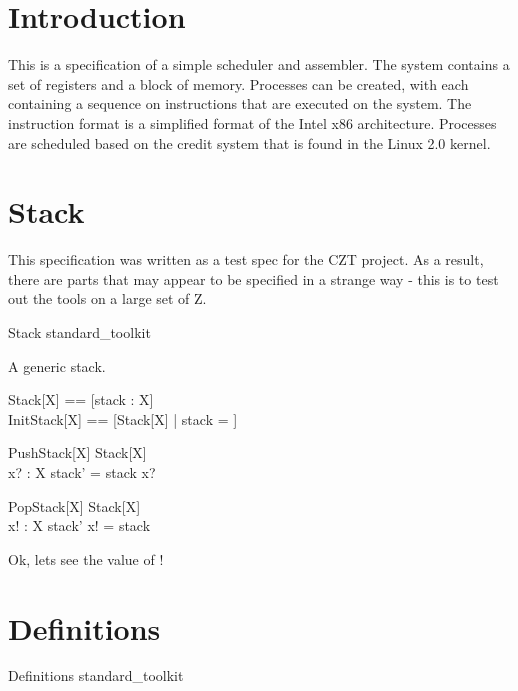 \documentclass{article}
\begin{document}
\section{Introduction}

This is a specification of a simple scheduler and assembler. The
system contains a set of registers and a block of memory. Processes
can be created, with each containing a sequence on instructions that
are executed on the system. The instruction format is a simplified
format of the Intel x86 architecture. Processes are scheduled based on
the credit system that is found in the Linux 2.0 kernel.

\section{Stack}

This specification was written as a test spec for the CZT project. As
a result, there are parts that may appear to be specified in a strange
way - this is to test out the tools on a large set of Z.

\begin{zsection}
  \SECTION Stack \parents standard\_toolkit
\end{zsection}

A generic stack.

\begin{zed}
  Stack[X] == [stack : \seq X]\\
  InitStack[X] == [Stack[X] | stack = \emptyset]
\end{zed}

\begin{schema}{PushStack}[X]
  \Delta Stack[X]\\
  x? : X
\where
  stack' = stack \cat \langle x? \rangle
\end{schema}

\begin{schema}{PopStack}[X]
  \Delta Stack[X]\\
  x! : X
\where
  stack' \cat \langle x! \rangle = stack
\end{schema}

\ZDeclSummary

Ok, lets see the value of \thecntZunboxed!

\section{Definitions}

\begin{zsection}
  \SECTION Definitions \parents standard\_toolkit
\end{zsection}
\end{document}
